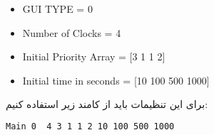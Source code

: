 \documentclass[oneside,a4paper,11pt]{report}
\begin{document}
		\begin{latin}
			\begin{itemize}
\item	
				GUI TYPE = 0
\item
			Number of Clocks = 4
\item
			Initial Priority Array = [3 1 1 2]
\item
			Initial time in seconds = [10 100 500 1000]
				\end{itemize}
	\end{latin}		

	برای این تنظیمات	باید از کامند زیر استفاده کنیم:
			\begin{latin}
\begin{lstlisting}[language=Bash]
Main 0  4 3 1 1 2 10 100 500 1000
\end{lstlisting}
		
	\end{latin}
	
\end{document}
